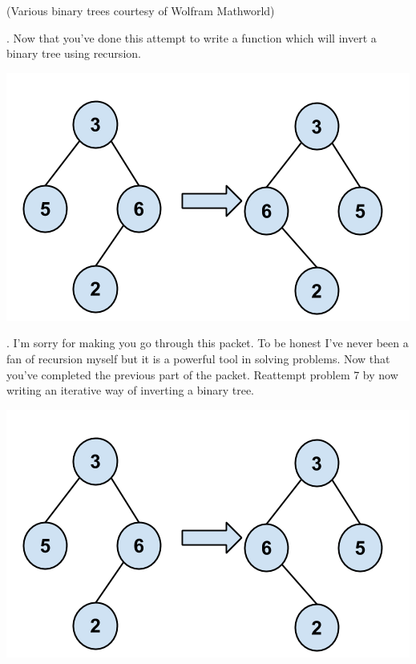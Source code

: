 \documentclass[12pt]{article}
\begin{document}
\centerline{(Various binary trees courtesy of Wolfram Mathworld)}
. Now that you've done this attempt to write a function which will invert a binary tree using recursion.\\
\centerline{\includegraphics[scale = 0.4]{invertbtree.png}}
. I'm sorry for making you go through this packet. To be honest I've never been a fan of recursion myself but it is a powerful tool in solving problems. Now that you've completed the previous part of the packet. Reattempt problem 7 by now writing an iterative way of inverting a binary tree.
\centerline{\includegraphics[scale = 0.4]{invertbtree.png}}
\end{document}
